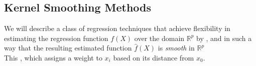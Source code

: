 \subsection{Kernel Smoothing Methods}
We will describe a class of regression techniques that achieve flexibility  in estimating the 
regression function $f(X)$ over the domain $\mathbb{R}^{p}$ by , and in such a way that the resulting 
estimated function $\hat{f}(X)$ is \textit{smooth} in $\mathbb{R}^{p}$\\ This , which assigns a weight 
to $x_{i}$ based on its distance from $x_{0}$.

